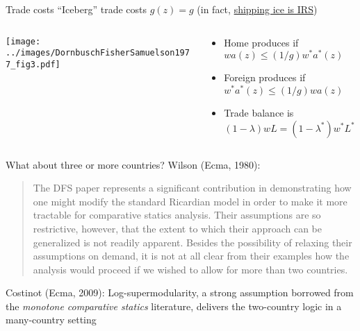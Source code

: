 \documentclass[10pt,notes=hide]{beamer}
\begin{document}
\begin{frame}{Trade costs}
``Iceberg'' trade costs $g(z) = g$ (in fact, \href{https://ideas.repec.org/p/ces/ceswps/_6881.html}{shipping ice is IRS})
\begin{columns}
\begin{column}{.53\textwidth}
\begin{center}\texttt{[image: ../images/DornbuschFisherSamuelson1977\_fig3.pdf]}\end{center}
\end{column}
\begin{column}{.45\textwidth}
\begin{itemize}
	\item Home produces if $w a(z) \leq (1/g) w^{*} a^{*}(z)$
	\item Foreign produces if $w^{*} a^{*}(z) \leq (1/g) w a(z)$
	\item Trade balance is $(1-\lambda)w L  = (1-\lambda^{*}) w^{*}L^{*}$
\end{itemize}
\end{column}
\end{columns}
\end{frame}
\begin{frame}{What about three or more countries?}
Wilson (Ecma, 1980):
\begin{quote}
{\small The DFS paper represents a significant contribution in demonstrating how one might modify the standard Ricardian model in order to make it more tractable for comparative statics analysis.
Their assumptions are so restrictive, however, that the extent to which their approach can be generalized is not readily apparent.
Besides the possibility of relaxing their assumptions on demand, it is not at all clear from their examples how the analysis would proceed if we wished to allow for more than two countries.\par}
\end{quote}
Costinot (Ecma, 2009): 
Log-supermodularity,
a strong assumption borrowed from the \textit{monotone comparative statics} literature,
delivers the two-country logic in a many-country setting
\end{frame}
\end{document}
